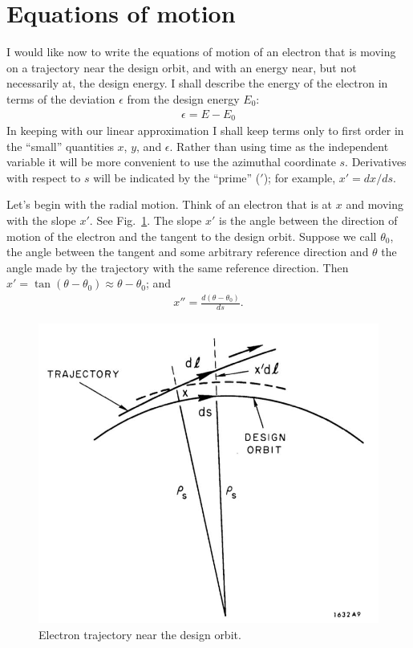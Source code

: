 \section{Equations of motion} \label{sec:EqsMotion}
I would like now to write the equations of motion of an electron that is moving on a trajectory near the design orbit, and with an energy near, but not necessarily at, the design energy. I shall describe the energy of the electron in terms of the deviation $\epsilon$ from the design energy $E_0$:
\begin{align}
	\epsilon = E-E_0
\end{align}
In keeping with our linear approximation I shall keep terms only to first order in the ``small'' quantities $x$, $y$, and $\epsilon$. Rather than using time as the independent variable it will be more convenient to use the azimuthal coordinate $s$. Derivatives with respect to $s$ will be indicated by the ``prime'' ($'$); for example, $x' = dx/ds$.

Let's begin with the radial motion. Think of an electron that is at $x$ and moving with the slope $x'$. See Fig.~\ref{fig:fig9}. The slope $x'$ is the angle between the direction of motion of the electron and the tangent to the design orbit. Suppose we call $\theta_0$, the angle between the tangent and some arbitrary reference direction and $\theta$ the angle made by the trajectory with the same reference direction. Then $x' = \tan(\theta - \theta_0) \approx \theta - \theta_0$; and
\begin{align} \label{eq:2.12}
	x'' = \frac{d(\theta-\theta_0)}{ds}.
\end{align}

\begin{figure}[!htb]
	\centering
	\includegraphics[width=0.6\linewidth]{./Figuras/fig09.jpeg}
	\caption{Electron trajectory near the design orbit.}
	\label{fig:fig9}
\end{figure}

